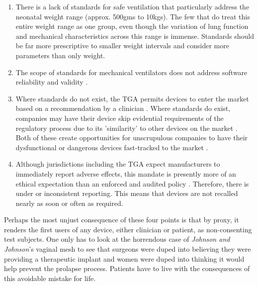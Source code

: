 \documentclass[12pt, openany, oneside]{book}
\begin{document}
\begin{enumerate}

\item There is a lack of standards for safe ventilation that particularly address the neonatal weight range  (approx. 500gms to 10kgs). The few that do treat this entire weight range as one group, even though the variation of lung function and mechanical characteristics across this range is immense. Standards should be far more prescriptive to smaller weight intervals and consider more parameters than only weight.
\item The scope of standards for mechanical ventilators does not address software reliability and validity \citep{muzza}.
\item Where standards do not exist, the TGA permits devices to enter the market based on a recommendation by a clinician \citep{tga}. Where standards do exist, companies may have their device skip evidential requirements of the regulatory process due to its 'similarity' to other devices on the market \citep{tga, walker2017ethics}. Both of these create opportunities for unscrupulous companies to have their dysfunctional or dangerous devices fast-tracked to the market \citep{walker2017ethics}. 
\item Although jurisdictions including the TGA expect manufacturers to immediately report adverse effects, this mandate is presently more of an ethical expectation than an enforced and audited policy \citep{walker2017ethics}. Therefore, there is under or inconsistent reporting. This means that devices are not recalled nearly as soon or often as required. 
\end{enumerate} 

Perhaps the most unjust consequence of these four points is that by proxy, it renders the first users of any device, either clinician or patient, as non-consenting test subjects. One only has to look at the horrendous case of \textit{Johnson and Johnson}'s vaginal mesh to see that surgeons were duped into believing they were providing a therapeutic implant and women were duped into thinking it would help prevent the prolapse process. Patients have to live with the consequences of this avoidable mistake for life. \\
\end{document}
